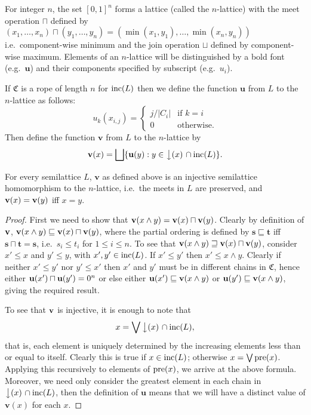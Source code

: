 \documentclass{report}
\begin{document}
\begin{defn}
    For integer $n$, the set $[0,1]^{n}$ forms a lattice (called the
    $n$-lattice) with the meet operation $\sqcap$ defined by
    $(x_1,\ldots,x_n)\sqcap(y_1,\ldots,y_n) = (\min(x_1,y_1),\ldots,
    \min(x_n,y_n))$ i.e.~component-wise minimum and the join operation
    $\sqcup$ defined by component-wise maximum. Elements of an 
    $n$-lattice will be distinguished by a bold font (e.g.~$\mathbf{u}$) 
    and their components specified by subscript (e.g.~$u_{i}$).

    If $\mathfrak{C}$ is a rope of length $n$ for $\operatorname{inc}(L)$ then we define the 
    function $\mathbf{u}$ from $L$ to the $n$-lattice as follows:
$$u_k(x_{i,j})=\left\{ \begin{array}{ll}
j/|C_{i}| & \text{if }k=i\\
0 & \text{otherwise.}
\end{array}\right. $$
    Then define the function $\mathbf{v}$ from $L$ to the 
    $n$-lattice by
$$\mathbf{v}(x) = \bigsqcup\{\mathbf{u}(y) : y \in 
\left\downarrow(x)\right.\cap\operatorname{inc}(L)\}.$$
\end{defn}

\begin{prop}
For every semilattice $L$, $\mathbf{v}$ as defined above is an injective semilattice homomorphism to the $n$-lattice, i.e.~the meets in $L$ are preserved, and $\mathbf{v}(x) = \mathbf{v}(y)$ iff $x = y$.
\end{prop}
\begin{proof}
First we need to show that $\mathbf{v}(x\land y) = \mathbf{v}(x)\sqcap\mathbf{v}(y)$. Clearly by definition of $\mathbf{v}$, $\mathbf{v}(x\land y) \sqsubseteq \mathbf{v}(x)\sqcap\mathbf{v}(y)$, where the partial ordering is defined by $\mathbf{s} \sqsubseteq \mathbf{t}$ iff $\mathbf{s} \sqcap \mathbf{t} = \mathbf{s}$, i.e.~$s_i \le t_i$ for $1 \le i \le n$. To see that $\mathbf{v}(x\land y) \sqsupseteq \mathbf{v}(x)\sqcap\mathbf{v}(y)$, consider $x' \le x$ and $y' \le y$, with $x',y' \in \operatorname{inc}(L)$. If $x' \le y'$ then $x' \le x \land y$. Clearly if neither $x' \le y'$ nor $y' \le x'$ then $x'$ and $y'$ must be in different chains in $\mathfrak{C}$, hence either $\mathbf{u}(x') \sqcap \mathbf{u}(y') = 0^n$ or else either $\mathbf{u}(x') \sqsubseteq \mathbf{v}(x\land y)$ or $\mathbf{u}(y') \sqsubseteq \mathbf{v}(x\land y)$, giving the required result.

To see that $\mathbf{v}$ is injective, it is enough to note that
$$x = \bigvee \left\downarrow(x)\right.\cap \operatorname{inc}(L),$$
that is, each element is uniquely determined by the increasing elements less than or equal to itself. Clearly this is true if $x\in \operatorname{inc}(L)$; otherwise $x = \bigvee \operatorname{pre}(x)$. Applying this recursively to elements of $\operatorname{pre}(x)$, we arrive at the above formula. Moreover, we need only consider the greatest element in each chain in $\left\downarrow(x)\right. \cap \operatorname{inc}(L)$, then the definition of $\mathbf{u}$ means that we will have a distinct value of $\mathbf{v}(x)$ for each $x$.
\end{proof}
\end{document}
